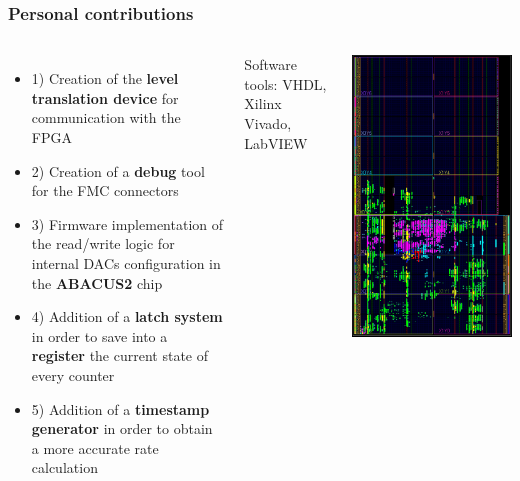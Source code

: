 \documentclass[aspectratio=169]{beamer}
\begin{document}
	
	\begin{frame}
	\frametitle{Personal contributions}
	\begin{columns}
		\begin{itemize}
			\item 1) {\color{teal} Creation of the \textbf{level translation device} for communication with the FPGA}
			\item 2) {\color{teal} Creation of a \textbf{debug} tool for the FMC connectors}
			\item 3) {\color{teal} Firmware implementation of the read/write logic for internal DACs configuration in the \textbf{ABACUS2} chip}
			\item 4) {\color{teal} Addition of a \textbf{latch system} in order to save into a \textbf{register} the current state of every counter}
			\item 5) {\color{teal} Addition of a \textbf{timestamp generator} in order to obtain a more accurate rate calculation}
		\end{itemize}
		Software tools: VHDL, Xilinx Vivado, LabVIEW
		\begin{center}
			\includegraphics[width=0.67 \textwidth]{IMG2/DEVICE.PNG}
		\end{center}
	\end{columns}
	
	\end{frame}
	
\end{document}
